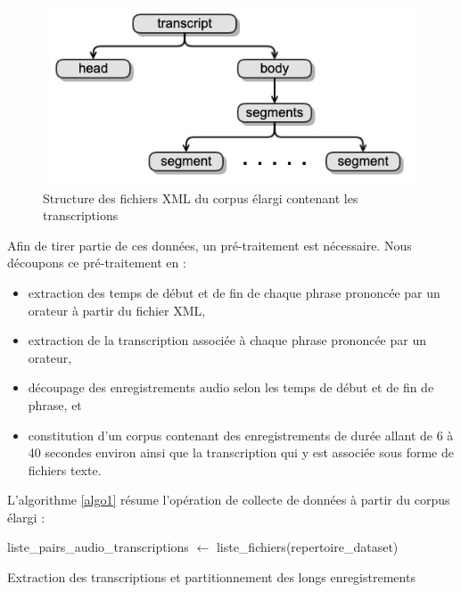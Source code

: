 \begin{figure}[H]
    \centering
    \includegraphics[height=150pt,width=325pt]{images/chap3/xml.jpg}
    \caption{Structure des fichiers XML du corpus élargi contenant les transcriptions}
\end{figure}

Afin de tirer partie de ces données, un pré-traitement est nécessaire. Nous découpons ce pré-traitement en : 
\begin{itemize}
    \item extraction des temps de début et de fin de chaque phrase prononcée par un orateur à partir du fichier XML,
    \item extraction de la transcription associée à chaque phrase prononcée par un orateur,
    \item découpage des enregistrements audio selon les temps de début et de fin de phrase, et
    \item constitution d'un corpus contenant des enregistrements de durée allant de 6 à 40 secondes environ ainsi que la transcription qui y est associée sous forme de fichiers texte. \\
\end{itemize}

L'algorithme \ref{algo1} résume l'opération de collecte de données à partir du corpus élargi : 


\begin{algorithm2e}[H]
\SetAlgoLined
\label{ext_trans}
\BlankLine
 liste\_pairs\_audio\_transcriptions $\gets$ liste\_fichiers(repertoire\_dataset) \\
\caption{Extraction des transcriptions et partitionnement des longs enregistrements \label{algo1}}
\end{algorithm2e}

